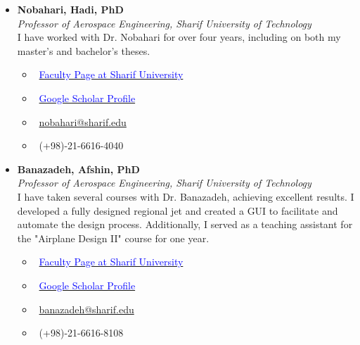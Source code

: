 \documentclass[12pt]{article}
\begin{document}
\begin{itemize}
	\item \textbf{Nobahari, Hadi, PhD} \vspace{1pt}\\
	\textit{Professor of Aerospace Engineering, Sharif University of Technology}
	 \vspace{2pt}\\
	I have worked with Dr. Nobahari for over four years, including on both my master's and bachelor's theses.
	\begin{multicols}{2}
		\begin{itemize}
			\item \faGlobe \ \href{https://ae.sharif.edu/~portal/faculty/1091235256}{\textcolor{blue}{Faculty Page at Sharif University}}
			\item \faGraduationCap \ \href{https://scholar.google.com/citations?user=vuUPY9kAAAAJ&hl=en&oi=ao}{\textcolor{blue}{Google Scholar Profile}}
			\item \faEnvelope \ \href{mailto:nobahari@sharif.edu}{nobahari@sharif.edu}
			\item \faPhone \ (+98)-21-6616-4040
		\end{itemize}
\end{multicols}
\end{itemize}





\begin{itemize}
	\item \textbf{Banazadeh, Afshin, PhD} \vspace{1pt}\\
	\textit{Professor of Aerospace Engineering, Sharif University of Technology}
	 \vspace{2pt}\\
I have taken several courses with Dr. Banazadeh, achieving excellent results. I developed a fully designed regional jet and created a GUI to facilitate and automate the design process. Additionally, I served as a teaching assistant for the "Airplane Design II" course for one year.

	\begin{multicols}{2}
		\begin{itemize}
			\item \faGlobe \ \href{http://ae.sharif.edu/~portal/faculty/1014037799}{\textcolor{blue}{Faculty Page at Sharif University}}
			\item \faGraduationCap \ \href{https://scholar.google.com/citations?user=8Z6xyyUAAAAJ&hl=en}{\textcolor{blue}{Google Scholar Profile}}
			\item \faEnvelope \ \href{mailto:banazadeh@sharif.edu}{banazadeh@sharif.edu}
			\item \faPhone \ (+98)-21-6616-8108
		\end{itemize}
\end{multicols}
\end{itemize}
\end{document}
